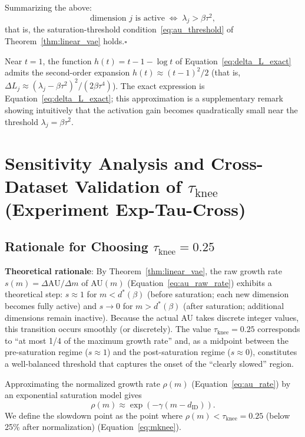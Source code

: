 \documentclass[make,article,submit,pdftex,moreauthors]{Definitions/mdpi}
\newcommand{\dID}{d_{\mathrm{ID}}}
\begin{document}
Summarizing the above:
\begin{equation}
  \text{dimension }j\text{ is active} \;\Longleftrightarrow\; \lambda_j > \beta\tau^2,
\end{equation}
that is, the saturation-threshold condition~\eqref{eq:au_threshold} of
Theorem~\ref{thm:linear_vae} holds.\hfill$\square$

\begin{Remark}
Near $t = 1$, the function $h(t) = t - 1 - \log t$ of
Equation~\eqref{eq:delta_L_exact} admits the second-order expansion
$h(t) \approx (t-1)^2/2$
(that is, $\Delta L_j \approx (\lambda_j - \beta\tau^2)^2/(2\beta\tau^4)$).
The exact expression is Equation~\eqref{eq:delta_L_exact}; this approximation is
a supplementary remark showing intuitively that the activation gain becomes
quadratically small near the threshold $\lambda_j = \beta\tau^2$.
\end{Remark}

\section[\appendixname~\thesection]{Sensitivity Analysis and Cross-Dataset Validation of $\tau_{\mathrm{knee}}$ (Experiment Exp-Tau-Cross)}\label{app:tau_knee}

\subsection*{Rationale for Choosing $\tau_{\mathrm{knee}} = 0.25$}

\textbf{Theoretical rationale}:
By Theorem~\ref{thm:linear_vae}, the raw growth rate
$s(m) = \Delta\mathrm{AU}/\Delta m$ of AU$(m)$
(Equation~\eqref{eq:au_raw_rate}) exhibits a theoretical step:
$s \approx 1$ for $m < d^*(\beta)$ (before saturation; each new dimension becomes
fully active) and $s \to 0$ for $m > d^*(\beta)$ (after saturation; additional
dimensions remain inactive).
Because the actual AU takes discrete integer values, this transition occurs
smoothly (or discretely).
The value $\tau_{\mathrm{knee}} = 0.25$ corresponds to ``at most 1/4 of the
maximum growth rate'' and, as a midpoint between the pre-saturation regime
($s \approx 1$) and the post-saturation regime ($s \approx 0$), constitutes a
well-balanced threshold that captures the onset of the ``clearly slowed''
region.

Approximating the normalized growth rate $\rho(m)$
(Equation~\eqref{eq:au_rate}) by an exponential saturation model gives
\begin{equation}
  \rho(m) \approx \exp(-\gamma (m - \dID)).
  \label{eq:knee_curvature}
\end{equation}
We define the slowdown point as the point where
$\rho(m) < \tau_{\mathrm{knee}} = 0.25$ (below 25\% after normalization)
(Equation~\eqref{eq:mknee}).
\end{document}
